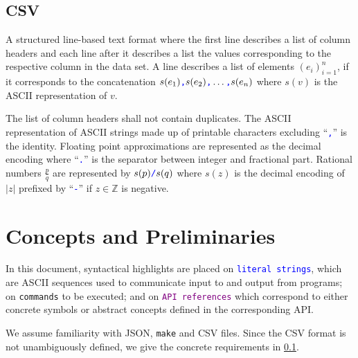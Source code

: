 \documentclass[a4paper,parskip=half]{article} %
\newcommand*\cmdstyle\texttt
\newcommand*\literalColor{blue}
\newcommand*\cmd[1]{\cmdstyle{\textcolor{red!85!black}{#1}}}
\newcommand*\literal[1]{\textcolor{\literalColor}{\cmdstyle{#1}}}
\newcommand*\api[1]{\textcolor{purple}{\cmdstyle{#1}}}
\begin{document}
\subsection{CSV}\label{sec:csv}
A structured line-based text format where the first line describes a
list of column headers and each line after it describes a list the
values corresponding to the respective column in the data set.
A line describes a list of elements $(e_i)_{i=1}^n$, if it corresponds
to the concatenation
$s(e_1)\literal,s(e_2)\literal,\ldots\literal,s(e_n)$
where $s(v)$ is the ASCII representation of $v$.

The list of column headers shall not contain duplicates.
The ASCII representation of ASCII strings made up of printable
characters excluding ``\literal,'' is the identity.
Floating point approximations are represented as the decimal encoding
where ``\literal.'' is the separator between integer and fractional
part. Rational numbers $\frac pq$ are represented by $s(p)\literal/s(q)$
where $s(z)$ is the decimal encoding of $|z|$ prefixed by ``\literal-''
if $z\in\mathbb Z$ is negative.

\section{Concepts and Preliminaries}

In this document, syntactical highlights are placed on
\literal{literal strings}, which are ASCII sequences used to communicate input
to and output from programs; on \cmd{commands} to be executed;
and on \api{API references} which correspond to
either concrete symbols or abstract concepts defined in the corresponding API.

We assume familiarity with JSON, \cmd{make} and CSV files. Since the CSV format
is not unambiguously defined, we give the concrete requirements in
\cref{sec:csv}.
\end{document}
